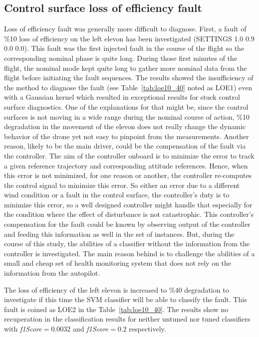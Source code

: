 \fi

\subsection{Control surface loss of efficiency fault}


Loss of efficiency fault was generally more difficult to diagnose. 
First, a fault of \%10 loss of efficiency on the left elevon has been investigated (SETTINGS 1.0 0.9 0.0 0.0). 
This fault was the first injected fault in the course of the flight so the corresponding nominal phase is quite long. 
During those first minutes of the flight, the nominal mode kept quite long to gather more nominal data from the flight before initiating the fault sequences. 
The results showed the insufficiency of the method to diagnose the fault (see Table~\ref{tab:loe10_40} noted as LOE1) even with a Gaussian kernel which resulted in exceptional results for stuck control surface diagnostics. 
One of the explanations for that might be, since the control surfaces is not moving in a wide range during the nominal course of action, \%10 degradation in the movement of the elevon does not really change the dynamic behavior of the drone yet not easy to pinpoint from the measurements.
Another reason, likely to be the main driver, could be the compensation of the fault via the controller.
The aim of the controller onboard is to minimize the error to track a given reference trajectory and corresponding attitude references. 
Hence, when this error is not minimized, for one reason or another, the controller re-computes the control signal to minimize this error. 
So either an error due to a different wind condition or a fault in the control surface, the controller's duty is to minimize this error, so a well designed controller might handle that especially for the condition where the effect of disturbance is not catastrophic. 
This controller's compensation for the fault could be known by observing output of the controller and feeding this information as well in the set of instances. 
But, during the course of this study, the abilities of a classifier without the information from the controller is investigated. 
The main reason behind is to challenge the abilities of a small and cheap set of health monitoring system that does not rely on the information from the autopilot. 

The loss of efficiency of the left elevon is increased to \%40 degradation to investigate if this time the SVM classifier will be able to classify the fault. This fault is coined as LOE2 in the Table~\ref{tab:loe10_40}. The results show no recuperation in the classification results for neither untuned nor tuned classifiers with \emph{f1Score}$=0.0032$ and \emph{f1Score}$=0.2$ respectively.


